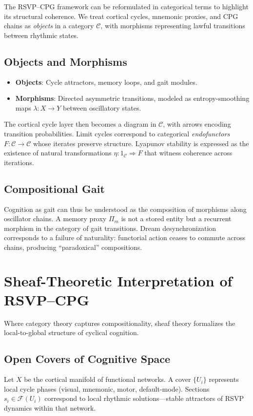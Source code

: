 \documentclass{article}
\begin{document}
The RSVP--CPG framework can be reformulated in categorical terms to highlight its structural coherence.  
We treat cortical cycles, mnemonic proxies, and CPG chains as \emph{objects} in a category $\mathcal{C}$, with morphisms representing lawful transitions between rhythmic states.  

\subsection{Objects and Morphisms}
\begin{itemize}
  \item \textbf{Objects}: Cycle attractors, memory loops, and gait modules.
  \item \textbf{Morphisms}: Directed asymmetric transitions, modeled as entropy-smoothing maps $\lambda : X \to Y$ between oscillatory states.
\end{itemize}

The cortical cycle layer then becomes a diagram in $\mathcal{C}$, with arrows encoding transition probabilities. Limit cycles correspond to categorical \emph{endofunctors} $F : \mathcal{C} \to \mathcal{C}$ whose iterates preserve structure.  
Lyapunov stability is expressed as the existence of natural transformations $\eta: 1_{\mathcal{C}} \Rightarrow F$ that witness coherence across iterations.

\subsection{Compositional Gait}
Cognition as gait can thus be understood as the composition of morphisms along oscillator chains. A memory proxy $\Pi_m$ is not a stored entity but a recurrent morphism in the category of gait transitions. Dream desynchronization corresponds to a failure of naturality: functorial action ceases to commute across chains, producing “paradoxical” compositions.

\section{Sheaf-Theoretic Interpretation of RSVP--CPG}

Where category theory captures compositionality, sheaf theory formalizes the local-to-global structure of cyclical cognition.

\subsection{Open Covers of Cognitive Space}
Let $X$ be the cortical manifold of functional networks. A cover $\{U_i\}$ represents local cycle phases (visual, mnemonic, motor, default-mode).  
Sections $s_i \in \mathcal{F}(U_i)$ correspond to local rhythmic solutions—stable attractors of RSVP dynamics within that network.
\end{document}
